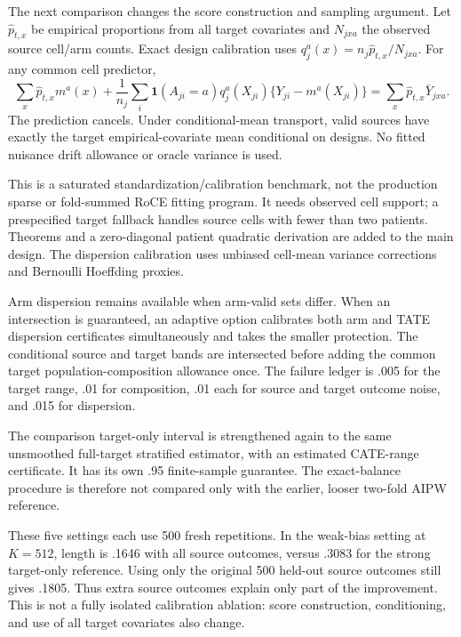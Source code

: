 \documentclass[11pt]{article}
\begin{document}
The next comparison changes the score construction and sampling argument.
Let $\hat p_{t,x}$ be empirical proportions from all target covariates and
$N_{jxa}$ the observed source cell/arm counts. Exact design calibration uses
$q_j^a(x)=n_j\hat p_{t,x}/N_{jxa}$. For any common cell predictor,
\[
 \sum_x\hat p_{t,x}m^a(x)+\frac1{n_j}\sum_i
 \mathbf1(A_{ji}=a)q_j^a(X_{ji})\{Y_{ji}-m^a(X_{ji})\}
 =\sum_x\hat p_{t,x}\bar Y_{jxa}.
\]
The prediction cancels. Under conditional-mean transport, valid sources have
exactly the target empirical-covariate mean conditional on designs. No fitted
nuisance drift allowance or oracle variance is used.

This is a saturated standardization/calibration benchmark, not the production
sparse or fold-summed RoCE fitting program. It needs observed cell support;
a prespecified target fallback handles source cells with fewer than two
patients. Theorems and a zero-diagonal patient quadratic derivation are added
to the main design. The dispersion calibration uses unbiased cell-mean
variance corrections and Bernoulli Hoeffding proxies.

Arm dispersion remains available when arm-valid sets differ. When an
intersection is guaranteed, an adaptive option calibrates both arm and TATE
dispersion certificates simultaneously and takes the smaller protection.
The conditional source and target bands are intersected before adding the
common target population-composition allowance once.
The failure ledger is .005 for the target range, .01 for composition,
.01 each for source and target outcome noise, and .015 for dispersion.

The comparison target-only interval is strengthened again to the same
unsmoothed full-target stratified estimator, with an estimated CATE-range
certificate. It has its own .95 finite-sample guarantee. The exact-balance
procedure is therefore not compared only with the earlier, looser two-fold
AIPW reference.

\begin{center}\small

\end{center}

These five settings each use 500 fresh repetitions. In the weak-bias setting
at $K=512$, length is .1646 with all source outcomes, versus .3083 for the
strong target-only reference. Using only the original 500 held-out source
outcomes still gives .1805. Thus extra source outcomes explain only part of
the improvement. This is not a fully isolated calibration ablation: score
construction, conditioning, and use of all target covariates also change.
\end{document}
